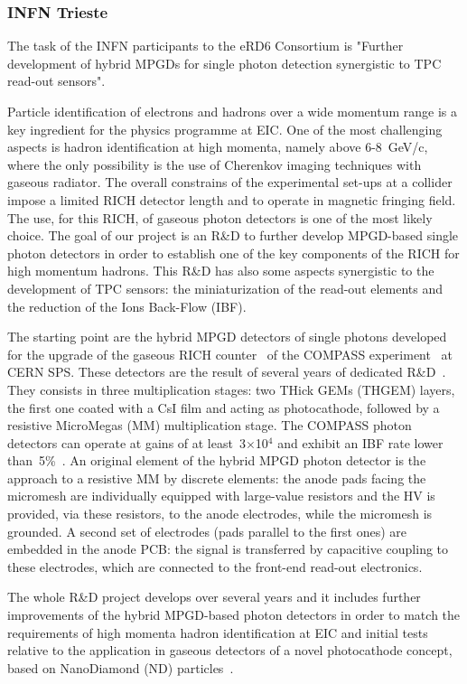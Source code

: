 \subsubsection{INFN Trieste} 
The task of the INFN participants to the eRD6 
Consortium is 
"Further development of hybrid MPGDs for single photon 
detection synergistic to TPC read-out sensors".
\par
Particle identification of electrons and hadrons
over a wide momentum range is a key ingredient 
for the physics programme at EIC. One of the most
challenging aspects is hadron identification at
high momenta, namely above 6-8~GeV/c, where the
only possibility is the use of Cherenkov imaging
techniques with gaseous radiator. The overall
constrains of the experimental set-ups at a
collider impose a limited RICH detector length 
and to operate in magnetic fringing field. 
The use, for this RICH,  
of gaseous photon detectors is 
one of the 
most likely choice. The goal of our project 
is an R\&D to further develop MPGD-based single photon
detectors in order to establish 
one of the key components of the RICH for high momentum
hadrons. This R\&D has also 
some aspects synergistic to the development 
of TPC sensors: the miniaturization of the 
read-out elements and the reduction of the 
Ions Back-Flow (IBF). 
\par
The starting point are the hybrid MPGD detectors
of single photons developed for the upgrade of 
the gaseous RICH 
counter~\cite{ALBRECHT2005215,
ABBON2008371,ABBON201021,
ABBON201126} of the COMPASS 
experiment~\cite{ABBON2007455,ABBON201569} 
at CERN SPS. These detectors are the result of 
several years of dedicated 
R\&D~\cites{ALEXEEV2009174,
ALEXEEV2010396,ALEXEEV2010129,
Alexeev:2012tba,
1748-0221-5-03-P03009,ALEXEEV2011130,ALEXEEV2012159,
1748-0221-7-02-C02014,
Alexeev:2012rva,ALEXEEV2013264,
1748-0221-8-12-C12005,
1748-0221-8-01-P01021,
ALEXEEV2014133,1748-0221-9-03-C03046,
1748-0221-9-09-C09017,
Levorato:2014gya,1748-0221-10-03-P03026,
ALEXEEV2016139,2017233}. 
They
consists in three
multiplication stages:
two THick GEMs (THGEM) layers, the first one
coated with a CsI film and acting as 
photocathode, followed by a resistive MicroMegas (MM)
multiplication stage. The COMPASS photon detectors 
can operate at gains of at least~3$\times$10$^4$
and exhibit an IBF rate lower 
than~5\%~\cite{ALEXEEV2016139,
ALEXEEV201796,1748-0221-12-07-C07026,AGARWALA2017,
AGARWALA2018}. 
An original element of
the hybrid MPGD photon detector is the approach
to a resistive MM by discrete elements:
the anode pads
facing the micromesh are
individually equipped with large-value resistors
and the HV is provided, via these resistors, to
the anode electrodes, while the micromesh is
grounded. A second set of electrodes (pads
parallel to the first ones) are embedded in the
anode PCB: the signal is transferred by 
capacitive coupling to these electrodes, 
which are connected to the front-end 
read-out electronics.
\par
The whole R\&D project develops over several years 
and it includes
further improvements of the hybrid MPGD-based photon 
detectors in order to match the requirements of high 
momenta hadron identification at EIC and initial tests
relative to  the application in gaseous detectors of a 
novel photocathode concept, based on NanoDiamond (ND) 
particles~\cite{VELARDI20171}.